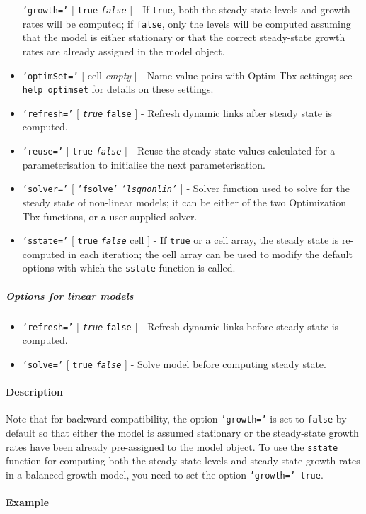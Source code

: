 \begin{itemize}
  \texttt{'growth='} {[} \texttt{true} \textbar{} \emph{\texttt{false}}
  {]} - If \texttt{true}, both the steady-state levels and growth rates
  will be computed; if \texttt{false}, only the levels will be computed
  assuming that the model is either stationary or that the correct
  steady-state growth rates are already assigned in the model object.
\item
  \texttt{'optimSet='} {[} cell \textbar{} \emph{empty} {]} - Name-value
  pairs with Optim Tbx settings; see \texttt{help optimset} for details
  on these settings.
\item
  \texttt{'refresh='} {[} \emph{\texttt{true}} \textbar{} \texttt{false}
  {]} - Refresh dynamic links after steady state is computed.
\item
  \texttt{'reuse='} {[} \texttt{true} \textbar{} \emph{\texttt{false}}
  {]} - Reuse the steady-state values calculated for a parameterisation
  to initialise the next parameterisation.
\item
  \texttt{'solver='} {[} \texttt{'fsolve'} \textbar{}
  \emph{\texttt{'lsqnonlin'}} {]} - Solver function used to solve for
  the steady state of non-linear models; it can be either of the two
  Optimization Tbx functions, or a user-supplied solver.
\item
  \texttt{'sstate='} {[} \texttt{true} \textbar{} \emph{\texttt{false}}
  \textbar{} cell {]} - If \texttt{true} or a cell array, the steady
  state is re-computed in each iteration; the cell array can be used to
  modify the default options with which the \texttt{sstate} function is
  called.
\end{itemize}

\subparagraph{Options for linear
models}

\begin{itemize}
\item
  \texttt{'refresh='} {[} \emph{\texttt{true}} \textbar{} \texttt{false}
  {]} - Refresh dynamic links before steady state is computed.
\item
  \texttt{'solve='} {[} \texttt{true} \textbar{} \emph{\texttt{false}}
  {]} - Solve model before computing steady state.
\end{itemize}

\paragraph{Description}

Note that for backward compatibility, the option \texttt{'growth='} is
set to \texttt{false} by default so that either the model is assumed
stationary or the steady-state growth rates have been already
pre-assigned to the model object. To use the \texttt{sstate} function
for computing both the steady-state levels and steady-state growth rates
in a balanced-growth model, you need to set the option
\texttt{'growth=' true}.

\paragraph{Example}


